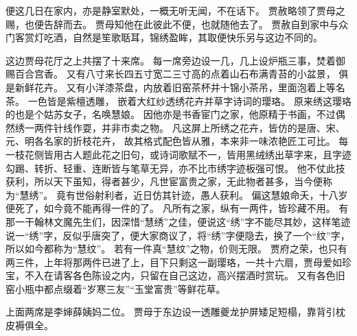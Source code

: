 便这几日在家内，亦是静室默处，一概无听无闻，不在话下。
贾赦略领了贾母之赐，也便告辞而去。
贾母知他在此彼此不便，也就随他去了。
贾赦自到家中与众门客赏灯吃酒，自然是笙歌聒耳，锦绣盈眸，其取便快乐另与这边不同的。
\par
这边贾母花厅之上共摆了十来席。
每一席旁边设一几，几上设炉瓶三事，焚着御赐百合宫香。
又有八寸来长四五寸宽二三寸高的点着山石布满青苔的小盆景，
俱是新鲜花卉。
又有小洋漆茶盘，内放着旧窑茶杯并十锦小茶吊，里面泡着上等名茶。
一色皆是紫檀透雕，
嵌着大红纱透绣花卉并草字诗词的璎珞。
原来绣这璎珞的也是个姑苏女子，名唤慧娘。
因他亦是书香宦门之家，他原精于书画，不过偶然绣一两件针线作耍，并非市卖之物。
凡这屏上所绣之花卉，皆仿的是唐、宋、元、明各名家的折枝花卉，
故其格式配色皆从雅，本来非一味浓艳匠工可比。
每一枝花侧皆用古人题此花之旧句，或诗词歌赋不一，皆用黑绒绣出草字来，且字迹勾踢、转折、轻重、连断皆与笔草无异，亦不比市绣字迹板强可恨。
他不仗此技获利，所以天下虽知，得者甚少，凡世宦富贵之家，无此物者甚多，当今便称为“慧绣”。
竟有世俗射利者，近日仿其针迹，愚人获利。
偏这慧娘命夭，十八岁便死了，如今竟不能再得一件的了。
凡所有之家，纵有一两件，皆珍藏不用。
有那一干翰林文魔先生们，因深惜“慧绣”之佳，便说这“绣”字不能尽其妙，这样笔迹说一“绣”字，反似乎唐突了，便大家商议了，将“绣”字便隐去，换了一个“纹”字，所以如今都称为“慧纹”。
若有一件真“慧纹”之物，价则无限。
贾府之荣，也只有两三件，上年将那两件已进了上，目下只剩这一副璎珞，一共十六扇，贾母爱如珍宝，不入在请客各色陈设之内，只留在自己这边，高兴摆酒时赏玩。
又有各色旧窑小瓶中都点缀着“岁寒三友”“玉堂富贵”等鲜花草。
\par
上面两席是李婶薛姨妈二位。
贾母于东边设一透雕夔龙护屏矮足短榻，靠背引枕皮褥俱全。
